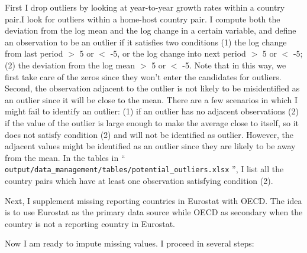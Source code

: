 \documentclass[notitlepage,11pt]{article}%
\begin{document}
First I drop outliers by looking at year-to-year growth rates within a country
pair.I look for outliers within a home-host country pair. I compute both the
deviation from the log mean and the log change in a certain variable, and
define an observation to be an outlier if it satisfies two conditions (1) the
log change from last period
$>$
5 or
$<$
-5, or the log change into next period
$>$%
5 or
$<$
-5; (2) the deviation from the log mean
$>$
5 or
$<$
-5. Note that in this way, we first take care of the zeros since they won't
enter the candidates for outliers. Second, the observation adjacent to the
outlier is not likely to be misidentified as an outlier since it will be close
to the mean. There are a few scenarios in which I might fail to identify an
outlier: (1) if an outlier has no adjacent observations (2) if the value of
the outlier is large enough to make the average close to itself, so it does
not satisfy condition (2) and will not be identified as outlier. However, the
adjacent values might be identified as an outlier since they are likely to be
away from the mean. In the tables in \textquotedblleft%
\texttt{output/data\_management/tables/potential\_outliers.xlsx}%
\textquotedblright, I list all the country pairs which have at least one
observation satisfying condition (2).

Next, I supplement missing reporting countries in Eurostat with OECD. The idea
is to use Eurostat as the primary data source while OECD as secondary when the
country is not a reporting country in Eurostat.

Now I am ready to impute missing values. I proceed in several steps:
\end{document}

